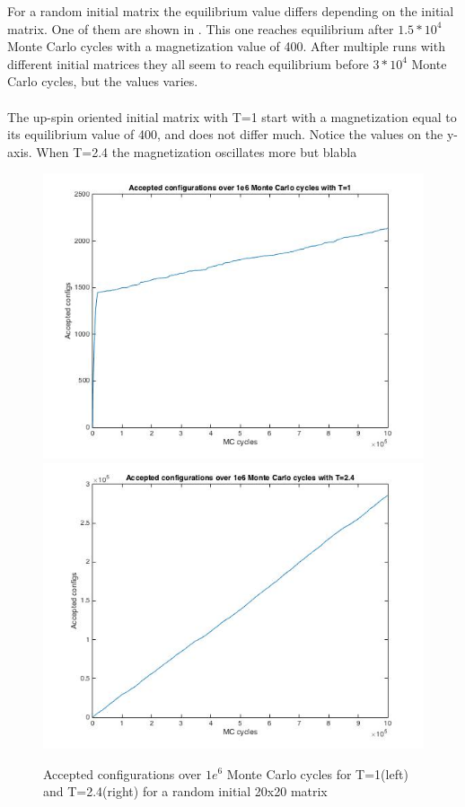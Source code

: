 \documentclass[10pt,a4paper]{article}
\begin{document}
\noindent For a random initial matrix the equilibrium value differs depending on the initial matrix. One of them are shown in . This one reaches equilibrium after $1.5*10^4$ Monte Carlo cycles with a magnetization value of 400. After multiple runs with different initial matrices they all seem to reach equilibrium before $3*10^4$ Monte Carlo cycles, but the values varies.\\
\\
The up-spin oriented initial matrix with T=1 start with a magnetization equal to its equilibrium value of 400, and does not differ much. Notice the values on the y-axis. When T=2.4 the magnetization oscillates more but blabla

\begin{figure}[H]
\centerline{
\includegraphics[scale=0.4]{acc20_1e6mc_T=1_ran}
\includegraphics[scale=0.4]{acc20_1e6mc_T=24_ran}
}
\caption{Accepted configurations over $1e^6$ Monte Carlo cycles for T=1(left) and T=2.4(right) for a random initial 20x20 matrix}
\label{fig:configs_20_1e6_rand}
\end{figure}
\end{document}
